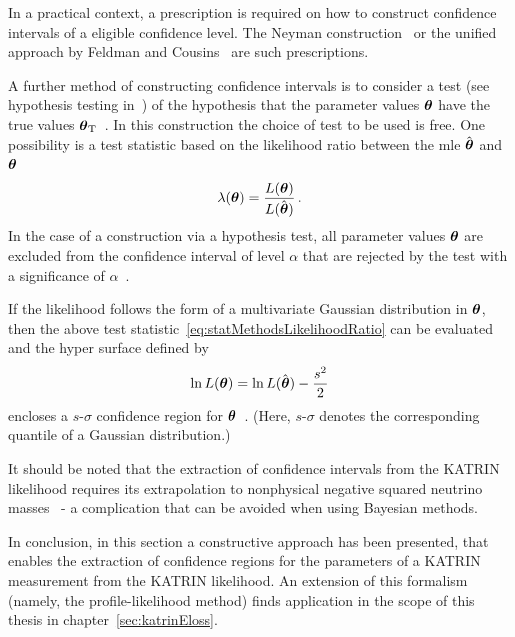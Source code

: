 In a practical context, a prescription is required on how to construct confidence intervals of a eligible confidence level. The Neyman construction~\cite{Neyman1937} or the unified approach by Feldman and Cousins~\cite{Feldman1998} are such prescriptions.

A further method of constructing confidence intervals is to consider a test (see hypothesis testing in~\cite{ReviewOfParticlePhysics}) of the hypothesis that the parameter values $\boldsymbol{\mathbf{\theta}}$ have the true values $\boldsymbol{\mathbf{\theta}}_\mathrm{T}$~\cite{ReviewOfParticlePhysics}. In this construction the choice of test to be used is free. One possibility is a test statistic based on the likelihood ratio between the \gls{mle} $\hat{\boldsymbol{\mathbf{\theta}}}$ and $\boldsymbol{\mathbf{\theta}}$~\cite{ReviewOfParticlePhysics}
\begin{equation}
	\label{eq:statMethodsLikelihoodRatio}
	\lambda(\boldsymbol{\mathbf{\theta}}) =
	\frac{L(\boldsymbol{\mathbf{\theta}})}{L(\hat{\boldsymbol{\mathbf{\theta}}})}
	\text{\,.}
\end{equation}
In the case of a construction via a hypothesis test, all parameter values $\boldsymbol{\mathbf{\theta}}$ are excluded from the confidence interval of level $\alpha$ that are rejected by the test with a significance of $\alpha$~\cite{ReviewOfParticlePhysics}.

If the likelihood follows the form of a multivariate Gaussian distribution in $\boldsymbol{\mathbf{\theta}}$, then the above test statistic~\eqref{eq:statMethodsLikelihoodRatio} can be evaluated and the hyper surface defined by
\begin{equation}
	\label{eq:statMethodsConfidenceContour}
	\ln L(\boldsymbol{\mathbf{\theta}}) = 	\ln L(\hat{\boldsymbol{\mathbf{\theta}}}) - \frac{s^2}{2}
\end{equation}
encloses a $s$-$\sigma$ confidence region for $\boldsymbol{\mathbf{\theta}}$~\cite{ReviewOfParticlePhysics}. (Here, $s$-$\sigma$ denotes the corresponding quantile of a Gaussian distribution.) 

It should be noted that the extraction of confidence intervals from the KATRIN likelihood requires its extrapolation to nonphysical negative squared neutrino masses~\cite{Kleesiek2014} - a complication that can be avoided when using Bayesian methods.

In conclusion, in this section a constructive approach has been presented, that enables the extraction of confidence regions for the parameters of a KATRIN measurement from the KATRIN likelihood. An extension of this formalism (namely, the profile-likelihood method) finds application in the scope of this thesis in chapter~\ref{sec:katrinEloss}.

